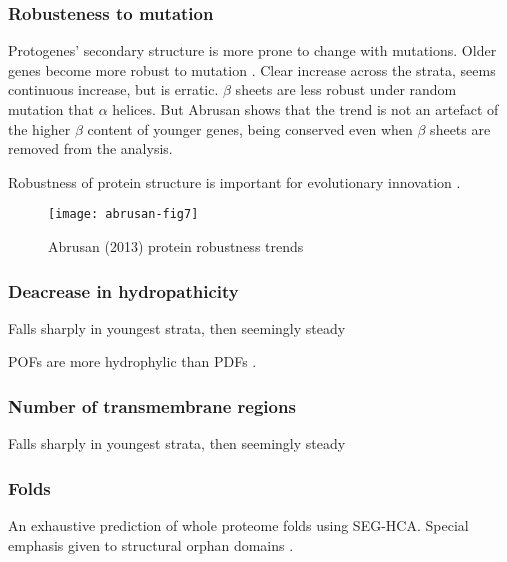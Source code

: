     \subsubsection{Robusteness to mutation}

        Protogenes' secondary structure is more prone to change with
        mutations.  Older genes become more robust to mutation
        \cite{abrusan_integration_2013}. Clear increase across the strata,
        seems continuous increase, but is erratic. $\beta$ sheets are less
        robust under random mutation that $\alpha$ helices. But Abrusan
        shows that the trend is not an artefact of the higher $\beta$
        content of younger genes, being conserved even when $\beta$ sheets
        are removed from the analysis.

        Robustness of protein structure is important for evolutionary
        innovation \cite{bloom_structural_2006, bloom_protein_2006,
        bloom_evolution_2007}.

        \begin{figure}[!hbpt] \centering
            \texttt{[image: abrusan-fig7]} \caption{Abrusan
            (2013) protein robustness trends} \end{figure}

    \subsubsection{Deacrease in hydropathicity}

        Falls sharply in youngest strata, then seemingly steady
        \cite{carvunis_proto-genes_2012}

        POFs are more hydrophylic than PDFs \cite{gollery_what_2006}.

    \subsubsection{Number of transmembrane regions}

        Falls sharply in youngest strata, then seemingly steady
        \cite{carvunis_proto-genes_2012}
        

    \subsubsection{Folds}

        An exhaustive prediction of whole proteome folds using SEG-HCA. Special
        emphasis given to structural orphan domains \cite{faure_comprehensive_2013}.

